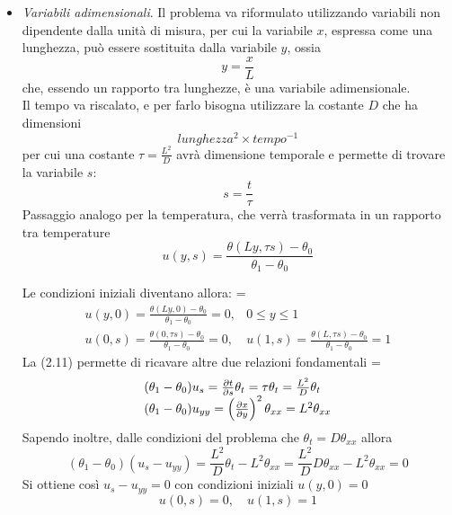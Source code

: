 \documentclass[a4paper,12pt, draft]{article}
\theoremstyle{break}
\numberwithin{equation}{section}
\begin{document}
\begin{itemize}
\item \emph{Variabili adimensionali}. Il problema va riformulato utilizzando variabili non dipendente dalla unità di misura, per cui la variabile $x$, espressa come una lunghezza, può essere sostituita dalla variabile $y$, ossia
$$y = \frac{x}{L}$$
che, essendo un rapporto tra lunghezze, è una variabile adimensionale. \\
Il tempo va riscalato, e per farlo bisogna utilizzare la costante $D$ che ha dimensioni $$
lunghezza^2 \times tempo^{-1}
$$
per cui una costante $\tau
= \frac{L^2}{D}$ avrà dimensione temporale e permette di trovare la variabile $s$:
$$s = \frac{t}{\tau}$$
Passaggio analogo per la temperatura, che verrà trasformata in un rapporto tra temperature
\begin{equation}
u(y,s) = \frac{\theta(Ly,\tau s)-\theta_0}{\theta_1 -\theta_0}
\end{equation}

Le condizioni iniziali diventano allora:
{\everymath = {\displaystyle}
$$
\begin{array}{ll}
u(y, 0) = \frac{\theta(Ly, 0) - \theta_0}{\theta_1 -\theta_0} = 0, & 0 \leq y \leq 1 \\
u(0, s) = \frac{\theta(0, \tau s) - \theta_0}{\theta_1 - \theta_0} = 0, & u(1, s) = \frac{\theta(L, \tau s) - \theta_0}{\theta_1 - \theta_0} = 1

\end{array}
$$
}
La (2.11) permette di ricavare altre due relazioni fondamentali
{\everymath = {\displaystyle}
$$
\begin{array}{l}
(\theta_1 -\theta_0) u_s = \pdv{t}{s} \theta_t=\tau
\theta_t = \frac{L^2}{D} \theta_t \\
(\theta_1 -\theta_0) u_{yy} = \left(\pdv{x}{y}\right)^2 \theta_{xx} = L^2 \theta_{xx}

\end{array}
$$
}
Sapendo inoltre, dalle condizioni del problema che $\theta_t = D \theta_{xx}$ allora
$$(\theta_1 - \theta_0) (u_s -u_{yy}) = \frac{L^2}{D}\theta_t - L^2 \theta_{xx} = \frac{L^2}{D} D\theta_{xx} - L^2 \theta_{xx} = 0$$
Si ottiene così $u_s - u_{yy} = 0$ con condizioni iniziali $u(y,0) = 0$
\begin{equation}
u(0,s) = 0,\quad u(1, s) = 1
\end{equation}


\end{itemize}
\end{document}

